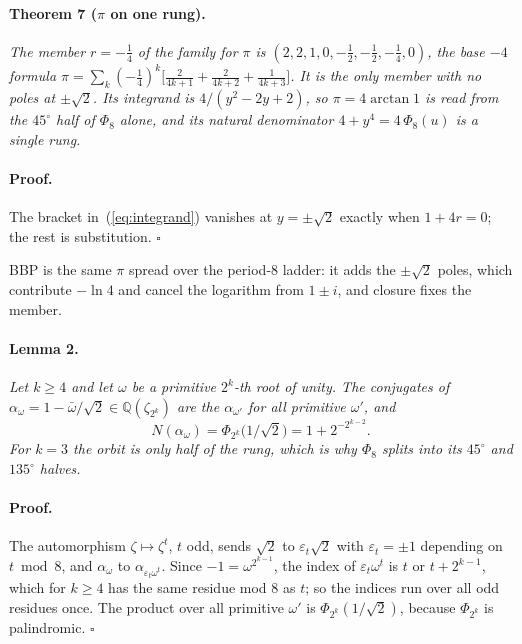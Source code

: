 \documentclass[twocolumn]{iopjournal}
\begin{document}
\paragraph{Theorem 7 ($\pi$ on one rung).} \textit{The member
$r = -\tfrac14$ of the family for $\pi$ is
$(2, 2, 1, 0, -\tfrac12, -\tfrac12, -\tfrac14, 0)$, the base $-4$
formula
$\pi = \sum_k (-\tfrac14)^k\big[\tfrac{2}{4k+1} + \tfrac{2}{4k+2} +
\tfrac{1}{4k+3}\big]$. It is the only member with no poles at
$\pm\sqrt2$. Its integrand is $4/(y^2 - 2y + 2)$, so
$\pi = 4\arctan 1$ is read from the $45^\circ$ half of $\Phi_8$ alone,
and its natural denominator $4 + y^4 = 4\,\Phi_8(u)$ is a single
rung.}

\paragraph{Proof.} The bracket in~(\ref{eq:integrand}) vanishes at
$y = \pm\sqrt2$ exactly when $1 + 4r = 0$; the rest is
substitution. \hfill $\square$

\medskip
\noindent
BBP is the same $\pi$ spread over the period-$8$ ladder: it adds the
$\pm\sqrt2$ poles, which contribute $-\ln 4$ and cancel the logarithm
from $1 \pm i$, and closure fixes the member.

\paragraph{Lemma 2.} \textit{Let $k \ge 4$ and let $\omega$ be a
primitive $2^k$-th root of unity. The conjugates of
$\alpha_\omega = 1 - \bar\omega/\sqrt2 \in \mathbb{Q}(\zeta_{2^k})$
are the $\alpha_{\omega'}$ for all primitive $\omega'$, and}
\begin{equation}
  N(\alpha_\omega) = \Phi_{2^k}\!\big(1/\sqrt2\big)
  = 1 + 2^{-2^{k-2}}.
\end{equation}
\textit{For $k = 3$ the orbit is only half of the rung, which is why
$\Phi_8$ splits into its $45^\circ$ and $135^\circ$ halves.}

\paragraph{Proof.} The automorphism $\zeta \mapsto \zeta^t$, $t$ odd,
sends $\sqrt2$ to $\varepsilon_t\sqrt2$ with $\varepsilon_t = \pm1$
depending on $t \bmod 8$, and $\alpha_\omega$ to
$\alpha_{\varepsilon_t\omega^t}$. Since $-1 = \omega^{2^{k-1}}$, the
index of $\varepsilon_t\omega^t$ is $t$ or $t + 2^{k-1}$, which for
$k \ge 4$ has the same residue mod 8 as $t$; so the indices run over
all odd residues once. The product over all primitive $\omega'$ is
$\Phi_{2^k}(1/\sqrt2)$, because $\Phi_{2^k}$ is palindromic.
\hfill $\square$
\end{document}
